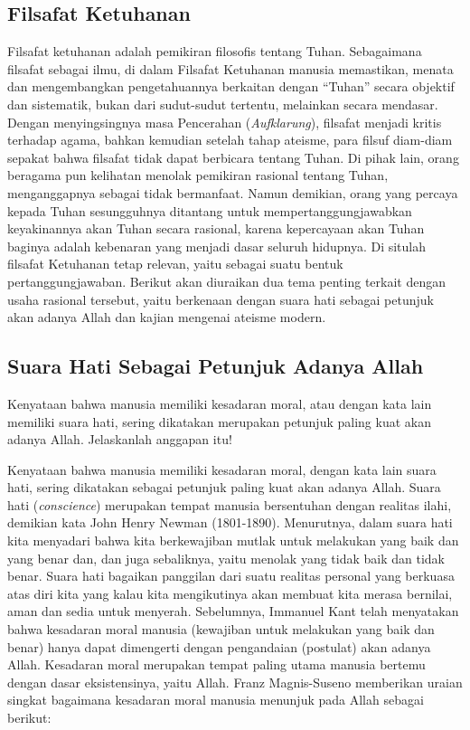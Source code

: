 \documentclass[10pt,a4paper]{article}
\renewenvironment{quote}
{\list{}{%
       \leftmargin 1.5em 
       \rightmargin 0em}
   \item\relax}
{\endlist}
\begin{document}
\begin{multicols}{2}
\hypertarget{filsafat-ketuhanan}{%
\section{Filsafat Ketuhanan}\label{filsafat-ketuhanan}}

Filsafat ketuhanan adalah pemikiran filosofis tentang Tuhan. Sebagaimana
filsafat sebagai ilmu, di dalam Filsafat Ketuhanan manusia memastikan,
menata dan mengembangkan pengetahuannya berkaitan dengan ``Tuhan''
secara objektif dan sistematik, bukan dari sudut-sudut tertentu,
melainkan secara mendasar. Dengan menyingsingnya masa Pencerahan
(\emph{Aufklarung}), filsafat menjadi kritis terhadap agama, bahkan
kemudian setelah tahap ateisme, para filsuf diam-diam sepakat bahwa
filsafat tidak dapat berbicara tentang Tuhan. Di pihak lain, orang
beragama pun kelihatan menolak pemikiran rasional tentang Tuhan,
menganggapnya sebagai tidak bermanfaat. Namun demikian, orang yang
percaya kepada Tuhan sesungguhnya ditantang untuk mempertanggungjawabkan
keyakinannya akan Tuhan secara rasional, karena kepercayaan akan Tuhan
baginya adalah kebenaran yang menjadi dasar seluruh hidupnya. Di situlah
filsafat Ketuhanan tetap relevan, yaitu sebagai suatu bentuk
pertanggungjawaban. Berikut akan diuraikan dua tema penting terkait
dengan usaha rasional tersebut, yaitu berkenaan dengan suara hati
sebagai petunjuk akan adanya Allah dan kajian mengenai ateisme modern.

\hypertarget{suara-hati-sebagai-petunjuk-adanya-allah}{%
\subsection{Suara Hati Sebagai Petunjuk Adanya
Allah}\label{suara-hati-sebagai-petunjuk-adanya-allah}}

\begin{quote}
Kenyataan bahwa manusia memiliki kesadaran moral, atau dengan kata lain
memiliki suara hati, sering dikatakan merupakan petunjuk paling kuat
akan adanya Allah. Jelaskanlah anggapan itu!
\end{quote}

Kenyataan bahwa manusia memiliki kesadaran moral, dengan kata lain suara
hati, sering dikatakan sebagai petunjuk paling kuat akan adanya Allah.
Suara hati (\emph{conscience}) merupakan tempat manusia bersentuhan
dengan realitas ilahi, demikian kata John Henry Newman (1801-1890).
Menurutnya, dalam suara hati kita menyadari bahwa kita berkewajiban
mutlak untuk melakukan yang baik dan yang benar dan, dan juga
sebaliknya, yaitu menolak yang tidak baik dan tidak benar. Suara hati
bagaikan panggilan dari suatu realitas personal yang berkuasa atas diri
kita yang kalau kita mengikutinya akan membuat kita merasa bernilai,
aman dan sedia untuk menyerah. Sebelumnya, Immanuel Kant telah
menyatakan bahwa kesadaran moral manusia (kewajiban untuk melakukan yang
baik dan benar) hanya dapat dimengerti dengan pengandaian (postulat)
akan adanya Allah. Kesadaran moral merupakan tempat paling utama manusia
bertemu dengan dasar eksistensinya, yaitu Allah. Franz Magnis-Suseno
memberikan uraian singkat bagaimana kesadaran moral manusia menunjuk
pada Allah sebagai berikut:


\end{multicols}
\end{document}
